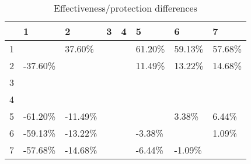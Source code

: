 \begin{table}[ht]
\centering
\begin{tabular}{rlllllll}
  \hline
 & 1 & 2 & 3 & 4 & 5 & 6 & 7 \\ 
  \hline
1 &  & 37.60\% &  &  & 61.20\% & 59.13\% & 57.68\% \\ 
  2 & -37.60\% &  &  &  & 11.49\% & 13.22\% & 14.68\% \\ 
  3 &  &  &  &  &  &  &  \\ 
  4 &  &  &  &  &  &  &  \\ 
  5 & -61.20\% & -11.49\% &  &  &  & 3.38\% & 6.44\% \\ 
  6 & -59.13\% & -13.22\% &  &  & -3.38\% &  & 1.09\% \\ 
  7 & -57.68\% & -14.68\% &  &  & -6.44\% & -1.09\% &  \\ 
   \hline
\end{tabular}
\caption{Effectiveness/protection differences} 
\end{table}
